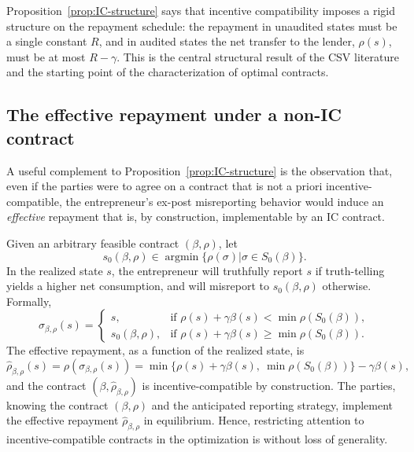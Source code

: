 \documentclass[11pt,a4paper,oneside]{book}
\def\geq{\geqslant}
\DeclareMathOperator*{\argmin}{argmin}
\theoremstyle{plain}
\theoremstyle{definition}
\theoremstyle{remark}
\numberwithin{equation}{chapter}
\begin{document}
Proposition~\ref{prop:IC-structure} says that incentive compatibility imposes a rigid structure on the repayment schedule: the repayment in unaudited states must be a single constant $R$, and in audited states the net transfer to the lender, $\rho(s)$, must be at most $R - \gamma$.
This is the central structural result of the CSV literature and the starting point of the characterization of optimal contracts.

\subsection{The effective repayment under a non-IC contract}

A useful complement to Proposition~\ref{prop:IC-structure} is the observation that, even if the parties were to agree on a contract that is not a priori incentive-compatible, the entrepreneur's ex-post misreporting behavior would induce an \emph{effective} repayment that is, by construction, implementable by an IC contract.

Given an arbitrary feasible contract $(\beta, \rho)$, let
\begin{equation*}
  s_0(\beta, \rho) \in \argmin \{ \rho(\sigma) \vert \sigma \in S_0(\beta) \}.
\end{equation*}
In the realized state $s$, the entrepreneur will truthfully report $s$ if truth-telling yields a higher net consumption, and will misreport to $s_0(\beta, \rho)$ otherwise.
Formally,
\begin{equation*}
  \sigma_{\beta, \rho}(s)
  = \begin{cases}
    s, & \text{if } \rho(s) + \gamma \beta(s) < \min \rho(S_0(\beta)), \\
    s_0(\beta, \rho), & \text{if } \rho(s) + \gamma \beta(s) \geq \min \rho(S_0(\beta)).
  \end{cases}
\end{equation*}
The effective repayment, as a function of the realized state, is
\begin{equation}\label{eq:effective-rho}
  \widehat{\rho}_{\beta, \rho}(s) = \rho(\sigma_{\beta, \rho}(s))
  = \min\bigl\{ \rho(s) + \gamma \beta(s), \ \min \rho(S_0(\beta)) \bigr\} - \gamma \beta(s),
\end{equation}
and the contract $(\beta, \widehat{\rho}_{\beta, \rho})$ is incentive-compatible by construction.
The parties, knowing the contract $(\beta, \rho)$ and the anticipated reporting strategy, implement the effective repayment $\widehat{\rho}_{\beta, \rho}$ in equilibrium.
Hence, restricting attention to incentive-compatible contracts in the optimization is without loss of generality.
\end{document}
